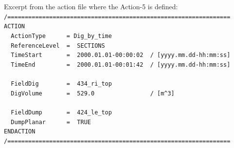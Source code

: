 \newpage
Excerpt from the action file where the Action-5 is defined:
\\ \hspace*{3mm} \texttt{\small{/================================================================}}
\\ \hspace*{3mm} \texttt{\small{ACTION}}
\\ \hspace*{3mm} \texttt{\small{~~ActionType~~~~~~=~Dig\_by\_time}}
\\ \hspace*{3mm} \texttt{\small{~~ReferenceLevel~~=~~SECTIONS}}
\\ \hspace*{3mm} \texttt{\small{~~TimeStart~~~~~~~=~~2000.01.01-00:00:02~~/~[yyyy.mm.dd-hh:mm:ss]}}
\\ \hspace*{3mm} \texttt{\small{~~TimeEnd ~~~~~~~~=~~2000.01.01-00:01:42~~/~[yyyy.mm.dd-hh:mm:ss]}}
\\ \hspace*{3mm}
\\ \hspace*{3mm} \texttt{\small{~~FieldDig~~~~~~~~=~~434\_ri\_top}}
\\ \hspace*{3mm} \texttt{\small{~~DigVolume~~~~~~~=~~529.0~~~~~~~~~~~~~~~~/~[m\textasciicircum3]}}
\\ \hspace*{3mm}
\\ \hspace*{3mm} \texttt{\small{~~FieldDump~~~~~~~=~~424\_le\_top}}
\\ \hspace*{3mm} \texttt{\small{~~DumpPlanar~~~~~~=~~TRUE}}
\\ \hspace*{3mm} \texttt{\small{ENDACTION}}
\\ \hspace*{3mm} \texttt{\small{/================================================================}}


\newpage

